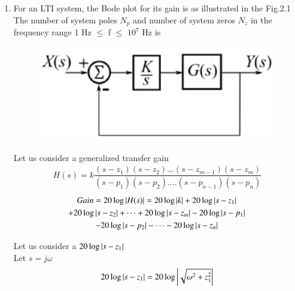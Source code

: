 \begin{enumerate}[label=\thesection.\arabic*.,ref=\thesection.\theenumi]

\item 
\begin{flushleft}
\textsf{ For an LTI system, the Bode plot for its gain is as illustrated in the Fig.2.1 The number of system poles $N_{p}$ and number of system zeros $N_{z}$ in the frequency range 1 Hz $\leq$ f $\leq$ $10^{7}$ Hz is}
\end{flushleft}

\begin{figure}[htp]
    \centering
    \includegraphics[width=\columnwidth]{./figs/ee18btech11001/ee18btech11001.eps}
    \caption{}
    \label{fig:galaxy}
\end{figure}

\solution 
\textsf{Let us consider a generalized transfer gain}
\\
\begin{align}
H(s) = k \dfrac{(s-z_{1})(s-z_{2})...(s-z_{m-1})(s-z_{m})}{(s-p_{1})(s-p_{2})....(s-p_{n-1})(s-p_{n})}
\end{align}
\begin{multline}
Gain = 20\log\left\vert H(s)\right\vert = 20\log \left\vert k\right\vert + 20\log \left\vert s-z_{1}\right\vert 
    \\
    + 20\log \left\vert s-z_{2}\right\vert + \dots + 20\log \left\vert s-z_{m}\right\vert - 20\log \left\vert s-p_{1}\right\vert 
    \\
    - 20\log \left\vert s-p_{2}\right\vert - \dots - 20\log \left\vert s-z_{n}\right\vert 
\end{multline}



Let us consider a $ 20\log \left\vert s-z_{1}\right\vert $
\\
Let $s = j\omega$
\\

\begin{align}
	20\log \left\vert s-z_{1}\right\vert = 20\log \left\vert\sqrt{\omega^{2} + z_{1}^{2}}\right\vert 
\end{align}


\end{enumerate}
